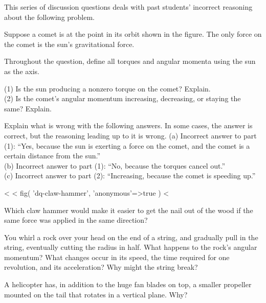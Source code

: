 \begin{dq}
This series of discussion questions deals with past
students' incorrect reasoning about the following problem.

\begin{indentedblock}
Suppose a comet is at the point in its orbit shown in the
figure. The only force on the comet is the sun's gravitational force.

\noindent{}

\noindent Throughout the question, define all torques and angular
momenta using the sun as the axis.

\noindent (1) Is the sun producing a nonzero torque on the comet? Explain.\\
(2) Is the comet's angular momentum increasing, decreasing,
or staying the same? Explain.
\end{indentedblock}

\noindent Explain what is wrong with the following answers. In some
cases, the answer is correct, but the reasoning leading up to it is wrong.
(a) Incorrect answer to part (1): ``Yes, because the sun is
exerting a force on the comet, and the comet is a certain
distance from the sun.''\\
(b) Incorrect answer to part (1): ``No, because the
torques cancel out.''\\
(c) Incorrect answer to part (2): ``Increasing, because the
comet is speeding up.''
\end{dq}

<%
<%
  fig(
    'dq-claw-hammer',
    {
      'anonymous'=>true
    }
  )
<%

\begin{dq}\label{dq:claw-hammer}
Which claw hammer would make it easier to get the nail
out of the wood if the same force was applied in the same direction?
\end{dq}

\begin{dq}
You whirl a rock over your head on the end of a string,
and gradually pull in the string, eventually cutting the
radius in half. What happens to the rock's angular momentum?
What changes occur in its speed, the time required for one
revolution, and its acceleration? Why might the string break?
\end{dq}


\begin{dq}
A helicopter has, in addition to the huge fan blades on
top, a smaller propeller mounted on the tail that rotates in
a vertical plane. Why?
\end{dq}

